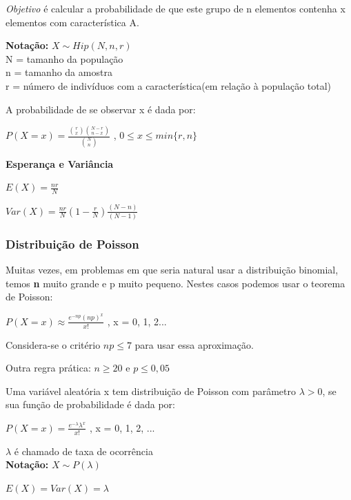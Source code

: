 \documentclass[a4paper, 12pt]{article}
\begin{document}
	\textit{Objetivo} é calcular a probabilidade de que este grupo de n elementos contenha x elementos com característica A.
	
	\textbf{Notação:} $X\sim Hip(N, n, r)$ \\
	N = tamanho da população\\ n = tamanho da amostra\\ r = número de indivíduos com a característica(em relação à população total)
	
	A probabilidade de se observar x é dada por:
	\begin{center}
		$P(X = x) = \frac{{r \choose x} {N-r \choose n-x}}{{N \choose n}} $ , $0\leq x\leq min\{r, n\}$
	\end{center}
	
	\textbf{Esperança e Variância}
	\begin{center}
		\LARGE
		$E(X) = \frac{nr}{N}$
		
		$Var(X) = \frac{nr}{N}(1 - \frac{r}{N})\frac{(N-n)}{(N-1)}$ 
	\end{center}
	
\subsubsection{Distribuição de Poisson}	
	Muitas vezes, em problemas em que seria natural usar a distribuição binomial, temos \textbf{n} muito grande e p muito pequeno. Nestes casos podemos usar o teorema de Poisson:
	\begin{center}
		\LARGE
		$P(X = x) \approx \frac{e^{-np} (np)^{x}}{x!}$ , x = 0, 1, 2...
	\end{center}
	
	Considera-se o critério $np \leq 7$ para usar essa aproximação.
	
	Outra regra prática: $n \geq 20$ e $p \leq 0,05$
	
	Uma variável aleatória x tem distribuição de Poisson com parâmetro $\lambda > 0$, se sua função de probabilidade é dada por:
	\begin{center}
		\LARGE
		$P(X = x) = \frac{e^{- \lambda} \lambda ^{x}}{x!}$ , x = 0, 1, 2, ...
	\end{center}
	
	$\lambda$ é chamado de taxa de ocorrência\\
	\textbf{Notação:} $X \sim P(\lambda)$
	\begin{center}
		\LARGE
		$E(X) = Var(X) = \lambda$
	\end{center}
	
\newpage
\end{document}
